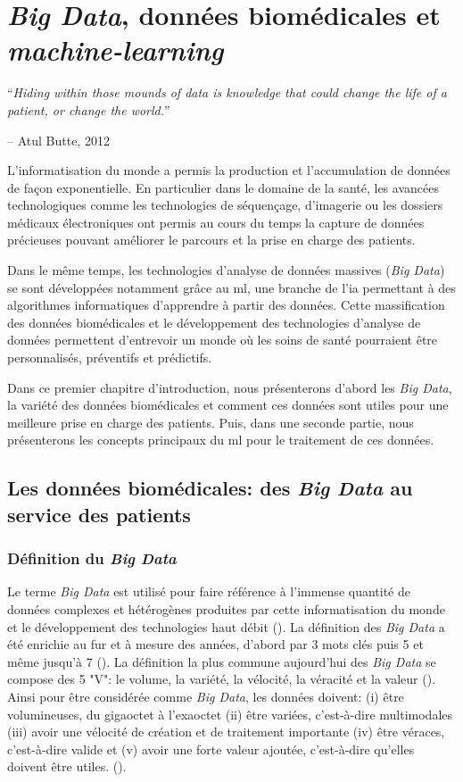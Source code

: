 \chapter{ \textit{Big Data}, données biomédicales et \textit{machine-learning}}

\epigraph{\LARGE{``\textit{Hiding within those mounds of data is knowledge that could change the life of a patient, or change the world.}''}}{\LARGE{-- Atul Butte, 2012}}

L'informatisation du monde a permis la production et l'accumulation de données de façon exponentielle. En particulier dans le domaine de la santé, les avancées technologiques comme les technologies de séquençage, d'imagerie ou les dossiers médicaux électroniques ont permis au cours du temps la capture de données précieuses pouvant améliorer le parcours et la prise en charge des patients.

Dans le même temps, les technologies d'analyse de données massives (\textit{Big Data}) se sont développées notamment grâce au \gls{ml}, une branche de l'\gls{ia} permettant à des algorithmes informatiques d'apprendre à partir des données. Cette massification des données biomédicales et le développement des technologies d'analyse de données permettent d'entrevoir un monde où les soins de santé pourraient être personnalisés, préventifs et prédictifs.

Dans ce premier chapitre d'introduction, nous présenterons d'abord les \textit{Big Data}, la variété des données biomédicales et comment ces données sont utiles pour une meilleure prise en charge des patients. Puis, dans une seconde partie, nous présenterons les concepts principaux du \gls{ml} pour le traitement de ces données.

\section{Les données biomédicales: des \textit{Big Data} au service des patients}

\subsection{Définition du \textit{Big Data}}

Le terme \textit{Big Data} est utilisé pour faire référence à l'immense quantité de données complexes et hétérogènes produites par cette informatisation du monde et le développement des technologies haut débit (\cite{de_mauro_formal_2016}). La définition des \textit{Big Data} a été enrichie au fur et à mesure des années, d'abord par 3 mots clés puis 5 et même jusqu'à 7 (\cite{garcia_what_2022}). La définition la plus commune aujourd'hui des \textit{Big Data} se compose des 5 "V": le volume, la variété, la vélocité, la véracité et la valeur (\cite{ishwarappa_brief_2015}). Ainsi pour être considérée comme \textit{Big Data}, les données doivent: (i) être volumineuses, du gigaoctet à l'exaoctet (ii) être variées, c'est-à-dire multimodales (iii) avoir une vélocité de création et de traitement importante (iv) être véraces, c'est-à-dire valide et (v) avoir une forte valeur ajoutée, c'est-à-dire qu'elles doivent être utiles. (\cite{garcia_what_2022}).

